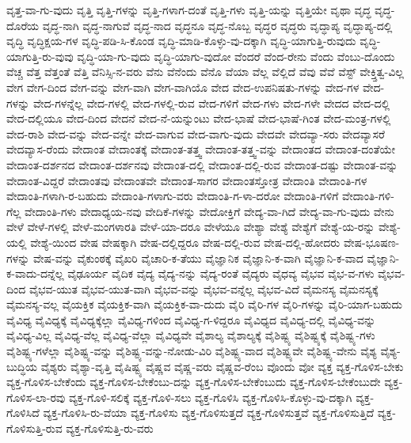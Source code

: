 {ವೃತ್ತ-ವಾ-ಗು-ವುದು
ವೃತ್ತಿ
ವೃತ್ತಿ-ಗಳನ್ನು
ವೃತ್ತಿ-ಗಳಾಗ-ದಂತೆ
ವೃತ್ತಿ-ಗಳು
ವೃತ್ತಿ-ಯನ್ನು
ವೃತ್ತಿಯೇ
ವೃಥಾ
ವೃದ್ಧ
ವೃದ್ಧ-ದೊರೆಯ
ವೃದ್ಧ-ನಾಗಿ
ವೃದ್ಧ-ನಾಗುವೆ
ವೃದ್ಧ-ನಾದ
ವೃದ್ಧನೂ
ವೃದ್ಧ-ನೊಬ್ಬ
ವೃದ್ಧರ
ವೃದ್ಧರು
ವೃದ್ಧಾಪ್ಯ
ವೃದ್ಧಾಪ್ಯ-ದಲ್ಲಿ
ವೃದ್ಧಿ
ವೃದ್ಧಿಕ್ಷಯ-ಗಳ
ವೃದ್ಧಿ-ಪಡಿ-ಸಿ-ಕೊಂಡ
ವೃದ್ಧಿ-ಮಾಡಿ-ಕೊಳ್ಳು-ವು-ದಕ್ಕಾಗಿ
ವೃದ್ಧಿ-ಯಾಗುತ್ತಿ-ರುವುದು
ವೃದ್ಧಿ-ಯಾಗುತ್ತಿ-ರು-ವುವು
ವೃದ್ಧಿ-ಯಾ-ಗು-ವುದು
ವೃದ್ಧಿ-ಯಾಗು-ವುದೋ
ವೆಂದರೆ
ವೆಂದ-ರೇನು
ವೆಂದು
ವೆಂಬು-ದೊಂದು
ವೆಚ್ಚ
ವೆತ್ತ
ವೆತ್ತಂತೆ
ವೆತ್ತಿ
ವೆನಿಸ್ಸಿ-ನ-ವರು
ವೆನು
ವೆನೆಂದು
ವೆನೊ
ವೆಯಾ
ವೆಲ್ಲ
ವೆಲ್ಲಿದೆ
ವೆವು
ವೆವೆ
ವೆಸ್ಟ್
ವೇಕ್ತ್ತಿತ್ವ-ವಿಲ್ಲ
ವೇಗ
ವೇಗ-ದಿಂದ
ವೇಗ-ವನ್ನು
ವೇಗ-ವಾಗಿ
ವೇಗ-ವಾಗಿಯೊ
ವೇದ
ವೇದ-ಉಪನಿಷತು-ಗಳನ್ನು
ವೇದ-ಗಳ
ವೇದ-ಗಳನ್ನು
ವೇದ-ಗಳನ್ನೆಲ್ಲ
ವೇದ-ಗಳಲ್ಲಿ
ವೇದ-ಗಳಲ್ಲಿ-ರುವ
ವೇದ-ಗಳಿಗೆ
ವೇದ-ಗಳು
ವೇದ-ಗಳೇ
ವೇದದ
ವೇದ-ದಲ್ಲಿ
ವೇದ-ದಲ್ಲಿಯೂ
ವೇದ-ದಿಂದ
ವೇದನೆ
ವೇದ-ನೆ-ಯನ್ನುಂಟು
ವೇದ-ಭಾಷೆ
ವೇದ-ಭಾಷೆ-ಗಿಂತ
ವೇದ-ಮಂತ್ರ-ಗಳಲ್ಲಿ
ವೇದ-ರಾಶಿ
ವೇದ-ವನ್ನು
ವೇದ-ವನ್ನೇ
ವೇದ-ವಾಗುವ
ವೇದ-ವಾಗು-ವುದು
ವೇದವೇ
ವೇದವ್ಯಾ-ಸರು
ವೇದವ್ಯಾಸರೆ
ವೇದವ್ಯಾಸ-ರೆಂದು
ವೇದಾಂತ
ವೇದಾಂತಕ್ಕೆ
ವೇದಾಂತ-ತತ್ತ್ವ
ವೇದಾಂತ-ತತ್ತ್ವ-ವನ್ನು
ವೇದಾಂತದ
ವೇದಾಂತ-ದಂತೆಯೇ
ವೇದಾಂತ-ದರ್ಶನದ
ವೇದಾಂತ-ದರ್ಶನವು
ವೇದಾಂತ-ದಲ್ಲಿ
ವೇದಾಂತ-ದಲ್ಲಿ-ರುವ
ವೇದಾಂತ-ದಷ್ಟು
ವೇದಾಂತ-ವನ್ನು
ವೇದಾಂತ-ವಿದ್ದರೆ
ವೇದಾಂತವು
ವೇದಾಂತವೇ
ವೇದಾಂತ-ಸಾಗರ
ವೇದಾಂತಸ್ತೋತ್ರ
ವೇದಾಂತಿ
ವೇದಾಂತಿ-ಗಳ
ವೇದಾಂತಿ-ಗಳಾಗಿ-ರ-ಬಹುದು
ವೇದಾಂತಿ-ಗಳಾಗು-ವರು
ವೇದಾಂತಿ-ಗ-ಳಾ-ದರೋ
ವೇದಾಂತಿ-ಗಳಿಗೆ
ವೇದಾಂತಿ-ಗಳಿ-ಗೆಲ್ಲ
ವೇದಾಂತಿ-ಗಳು
ವೇದಾಧ್ಯಯ-ನವು
ವೇದಿಕೆ-ಗಳನ್ನು
ವೇದೋಕ್ತಿಗೆ
ವೇದ್ಯ-ವಾ-ಗಿದೆ
ವೇದ್ಯ-ವಾ-ಗು-ವುದು
ವೇನು
ವೇಳೆ
ವೇಳೆ-ಗಳಲ್ಲಿ
ವೇಳೆ-ಮಂಗಳಾರತಿ
ವೇಳೆ-ಯಾ-ದರೂ
ವೇಳೆಯೂ
ವೇಶ್ಯಾ
ವೇಶ್ಯೆ
ವೇಶ್ಯೆಗೆ
ವೇಶ್ಯೆ-ಯ-ರನ್ನು
ವೇಶ್ಯೆ-ಯಲ್ಲಿ
ವೇಶ್ಯೆ-ಯಿಂದ
ವೇಷ
ವೇಷಕ್ಕಾಗಿ
ವೇಷ-ದಲ್ಲಿದ್ದರೂ
ವೇಷ-ದಲ್ಲಿ-ರುವ
ವೇಷ-ದಲ್ಲಿ-ಹೋದರು
ವೇಷ-ಭೂಷಣ-ಗಳನ್ನು
ವೇಷ-ವನ್ನು
ವೈಕುಂಠಕ್ಕೆ
ವೈಖರಿ
ವೈಚಾರಿ-ಕ-ತೆಯು
ವೈಜ್ಞಾನಿಕ
ವೈಜ್ಞಾನಿ-ಕ-ವಾಗಿ
ವೈಜ್ಞಾನಿ-ಕ-ವಾದ
ವೈಜ್ಞಾನಿ-ಕ-ವಾದು-ದನ್ನೆಲ್ಲ
ವೈಢೂರ್ಯ
ವೈದಿಕ
ವೈದ್ಯ
ವೈದ್ಯ-ನನ್ನು
ವೈದ್ಯ-ರಂತೆ
ವೈದ್ಯರು
ವೈಧವ್ಯ
ವೈಭವ
ವೈಭ-ವ-ಗಳು
ವೈಭವ-ದಿಂದ
ವೈಭವ-ಯುತ
ವೈಭವ-ಯುತ-ವಾಗಿ
ವೈಭವ-ವನ್ನು
ವೈಭವ-ವನ್ನೆಲ್ಲ
ವೈಭವ-ವಿದೆ
ವೈಮನಸ್ಯ
ವೈಮನಸ್ಯಕ್ಕೆ
ವೈಮನಸ್ಯ-ವಲ್ಲ
ವೈಯಕ್ತಿಕ
ವೈಯಕ್ತಿಕ-ವಾಗಿ
ವೈಯಕ್ತಿಕ-ವಾ-ದುದು
ವೈರಿ
ವೈರಿ-ಗಳ
ವೈರಿ-ಗಳನ್ನು
ವೈರಿ-ಯಾಗ-ಬಹುದು
ವೈವಿಧ್ಯ
ವೈವಿಧ್ಯಕ್ಕೆ
ವೈವಿಧ್ಯಕ್ಕೆಲ್ಲಾ
ವೈವಿಧ್ಯ-ಗಳಿಂದ
ವೈವಿಧ್ಯ-ಗ-ಳಿದ್ದರೂ
ವೈವಿಧ್ಯದ
ವೈವಿಧ್ಯ-ದಲ್ಲಿ
ವೈವಿಧ್ಯ-ವನ್ನು
ವೈವಿಧ್ಯ-ವಿಲ್ಲ
ವೈವಿಧ್ಯ-ವೆಲ್ಲ
ವೈವಿಧ್ಯ-ವೆಲ್ಲಾ
ವೈವಿಧ್ಯವೇ
ವೈಶಾಲ್ಯ
ವೈಶಾಲ್ಯಕ್ಕೆ
ವೈಶಿಷ್ಟ್ಯ
ವೈಶಿಷ್ಟ್ಯಕ್ಕೆ
ವೈಶಿಷ್ಟ್ಯ-ಗಳು
ವೈಶಿಷ್ಟ್ಯ-ಗಳೆಲ್ಲಾ
ವೈಶಿಷ್ಟ್ಯ-ವನ್ನು
ವೈಶಿಷ್ಟ್ಯ-ವನ್ನು-ನೋಡು-ವಿರಿ
ವೈಶಿಷ್ಟ್ಯ-ವಾದ
ವೈಶಿಷ್ಟ್ಯವೇ
ವೈಶಿಷ್ಟ್ಯ-ವೇನು
ವೈಶ್ಯ
ವೈಶ್ಯ-ಬುದ್ಧಿಯ
ವೈಶ್ಯರು
ವೈಶ್ಯಾ-ವೃತ್ತಿ
ವೈಷಿಷ್ಟ್ಯ
ವೈಷ್ಣವ
ವೈಷ್ಣ-ವರು
ವೈಷ್ಣವ-ರೆಂಬ
ವೊಂದು
ವೋ
ವ್ಯಕ್ತ
ವ್ಯಕ್ತ-ಗೊಳಿಸ-ಬೇಕು
ವ್ಯಕ್ತ-ಗೊಳಿಸ-ಬೇಕೆಂದು
ವ್ಯಕ್ತ-ಗೊಳಿಸ-ಬೇಕೆಂಬು-ದನ್ನು
ವ್ಯಕ್ತ-ಗೊಳಿಸ-ಬೇಕೆಂಬುದು
ವ್ಯಕ್ತ-ಗೊಳಿಸ-ಬೇಕೆಂಬುದೇ
ವ್ಯಕ್ತ-ಗೊಳಿಸ-ಲಾ-ರವು
ವ್ಯಕ್ತ-ಗೊಳಿ-ಸಲಿಕ್ಕೆ
ವ್ಯಕ್ತ-ಗೊಳಿ-ಸಲು
ವ್ಯಕ್ತ-ಗೊಳಿಸಿ
ವ್ಯಕ್ತ-ಗೊಳಿಸಿ-ಕೊಳ್ಳು-ವು-ದಕ್ಕಾಗಿ
ವ್ಯಕ್ತ-ಗೊಳಿಸಿದೆ
ವ್ಯಕ್ತ-ಗೊಳಿಸಿ-ರು-ವೆಯಾ
ವ್ಯಕ್ತ-ಗೊಳಿಸು
ವ್ಯಕ್ತ-ಗೊಳಿಸುತ್ತದೆ
ವ್ಯಕ್ತ-ಗೊಳಿಸುತ್ತವೆ
ವ್ಯಕ್ತ-ಗೊಳಿಸುತ್ತಿದೆ
ವ್ಯಕ್ತ-ಗೊಳಿಸುತ್ತಿ-ರುವ
ವ್ಯಕ್ತ-ಗೊಳಿಸುತ್ತಿ-ರು-ವರು
}
